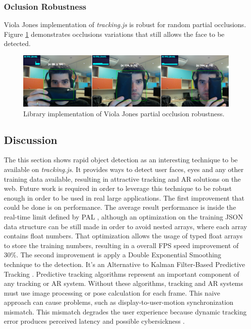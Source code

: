 
\subsubsection{Oclusion Robustness} %
\label{subsub:evaluation:rapid_object_detection:results:occlusion_robustness}

Viola Jones implementation of \textit{tracking.js} is robust for random partial occlusions. Figure \ref{figure:viola_occlusion} demonstrates occlusions variations that still allows the face to be detected.

\begin{figure}[!htb]
  \centering
  \includegraphics[width=\linewidth]{chapters/evaluation/viola_occlusion.png}
  \caption{Library implementation of Viola Jones partial occlusion robustness.}
  \label{figure:viola_occlusion}
\end{figure}


\subsection{Discussion} %
\label{sub:evaluation:rapid_object_detection:discussion}

The this section shows rapid object detection as an interesting technique to be available on \textit{tracking.js}. It provides ways to detect user faces, eyes and any other training data available, resulting in attractive tracking and AR solutions on the web. Future work is required in order to leverage this technique to be robust enough in order to be used in real large applications. The first improvement that could be done is on performance. The average result performance is inside the real-time limit defined by PAL \cite{PAL1962}, although an optimization on the training JSON data structure can be still made in order to avoid nested arrays, where each array contains float numbers. That optimization allows the usage of typed float arrays to store the training numbers, resulting in a overall FPS speed improvement of $30\%$. The second improvement is apply a Double Exponential Smoothing technique to the detection. It's an Alternative to Kalman Filter-Based Predictive Tracking \cite{LaViola2003}. Predictive tracking algorithms represent an important component of any tracking or AR system. Without these algorithms, tracking and AR systems must use image processing or pose calculation for each frame. This naive approach can cause problems, such as display-to-user-motion synchronization mismatch. This mismatch degrades the user experience because dynamic tracking error produces perceived latency and possible cybersickness \cite{LaViolaJr.2000}.


